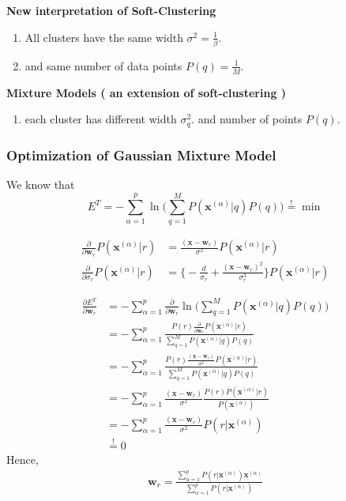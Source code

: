 \textbf{New interpretation of Soft-Clustering}
\begin{enumerate}
	\item All clusters have the same width $\sigma^2 = \frac{1}{\beta}$.
	\item and same number of data points $P(q) = \frac{1}{M}$.
\end{enumerate}

\textbf{Mixture Models ( an extension of soft-clustering )}
 \begin{enumerate}
 	\item each cluster has different width $\sigma_q^2$. and number of points $P(q)$.
 \end{enumerate}
 
 
 \subsubsection{Optimization of Gaussian Mixture Model}
 We know that 
 $$
 E^T = - \sum_{\alpha=1}^{p} \ln \bigg( \sum_{q=1}^{M} P( \boldsymbol{x}^{(\alpha)} |q) P(q) \bigg) \stackrel{!}{=} \min	
 $$
 
 \begin{align*}
 \frac{\partial }{\partial \boldsymbol{w}_r}  P( \boldsymbol{x}^{(\alpha)} |r) &= \frac{ (\boldsymbol{x} - \boldsymbol{w}_r )}{\sigma^2}P( \boldsymbol{x}^{(\alpha)} | r ) \\
 \frac{\partial }{\partial \sigma_r}  P( \boldsymbol{x}^{(\alpha)} |r) &= \bigg \{ -\frac{d}{\sigma_r}  + \frac{(\boldsymbol{x} - \boldsymbol{w}_r)^2}{\sigma_r^3} \bigg \} P(\boldsymbol{x}^{(\alpha)} | r)
 \end{align*}
 
 \begin{align*}
 	\frac{\partial E^T }{\partial \boldsymbol{w}_r} &= - \sum_{\alpha=1}^{p} \frac{\partial }{\partial \boldsymbol{w}_r}  \ln \bigg( \sum_{q=1}^{M} P( \boldsymbol{x}^{(\alpha)} |q) P(q) \bigg) \\
 	&= - \sum_{\alpha=1}^{p} \frac{ P(r)   \frac{\partial }{\partial \boldsymbol{w}_r}  P( \boldsymbol{x}^{(\alpha)} |r)  }{ \sum_{q=1}^{M} P( \boldsymbol{x}^{(\alpha)} |q) P(q) } \\
 	&= - \sum_{\alpha=1}^{p} \frac{ P(r)   \frac{ (\boldsymbol{x} - \boldsymbol{w}_r )}{\sigma^2}P( \boldsymbol{x}^{(\alpha)} | r )  }{ \sum_{q=1}^{M} P( \boldsymbol{x}^{(\alpha)} |q) P(q) } \\
 	&= - \sum_{\alpha=1}^{p}    \frac{ (\boldsymbol{x} - \boldsymbol{w}_r )}{\sigma^2} \frac{ P(r)P( \boldsymbol{x}^{(\alpha)} | r )  }{  P( \boldsymbol{x}^{(\alpha)}) } \\
 	 	&= - \sum_{\alpha=1}^{p}    \frac{ (\boldsymbol{x} - \boldsymbol{w}_r )}{\sigma^2}  P( r | \boldsymbol{x}^{(\alpha)}  ) \\
 	 	&\stackrel{!}{=}  0
 \end{align*}
 Hence, 
 \begin{align*}
 	\boldsymbol{w}_r = \frac{ \sum_{\alpha=1}^{p} P( r | \boldsymbol{x}^{(\alpha)}  ) \boldsymbol{x}^{(\alpha)} }{ \sum_{\alpha=1}^{p} P( r | \boldsymbol{x}^{(\alpha)}  ) } 
 \end{align*}
 
